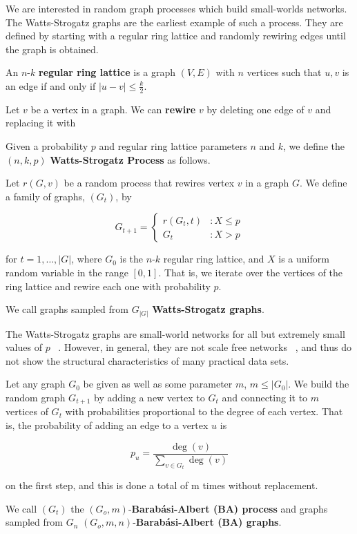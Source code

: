 We are interested in random graph processes which build small-worlds networks.
The Watts-Strogatz graphs are the earliest example of such a process. They are
defined by starting with a regular ring lattice and randomly rewiring edges
until the graph is obtained.

\begin{definition}
  An $n$-$k$ \textbf{regular ring lattice} is a graph $(V, E)$ with $n$ vertices
  such that $u,v$ is an edge if and only if $|u-v| \leq \frac{k}{2}$.
\end{definition}

\begin{definition}
  Let $v$ be a vertex in a graph. We can \textbf{rewire} $v$ by deleting one
  edge of $v$ and replacing it with 
\end{definition}

\begin{definition}
  Given a probability $p$ and regular ring lattice parameters $n$ and $k$, we
  define the $(n,k,p)$ \textbf{Watts-Strogatz Process} as follows.

  Let $r(G,v)$ be a random process that rewires vertex $v$ in a graph $G$. We
  define a family of graphs, $(G_t)$, by

  \[
    G_{t+1} = \left\{
      \begin{array}{lc}
        r(G_t,t) &: X \leq p \\
        G_t &: X > p
      \end{array}
    \right.
  \]

  for $t = 1,\dots, |G|$, where $G_0$ is the $n$-$k$ regular ring lattice, and
  $X$ is a uniform random variable in the range $[0,1]$. That is, we iterate
  over the vertices of the ring lattice and rewire each one with probability
  $p$.

  We call graphs sampled from $G_{|G|}$ \textbf{Watts-Strogatz graphs}.
\end{definition}

The Watts-Strogatz graphs are small-world networks for all but extremely small
values of $p$ ~\cite{Watts1998Collective}. However, in general, they are not
scale free networks ~\cite{Barabasi509}, and thus do not show the structural
characteristics of many practical data sets.

\begin{definition}
  Let any graph $G_0$ be given as well as some parameter $m$, $m \leq |G_0|$. We
  build the random graph $G_{t+1}$ by adding a new vertex to $G_t$ and
  connecting it to $m$ vertices of $G_t$ with probabilities proportional to the
  degree of each vertex. That is, the probability of adding an edge to a vertex
  $u$ is

  \[
    p_u = \frac{\deg(v)}{\sum_{v \in G_t} \deg(v)}
  \]

  on the first step, and this is done a total of m times without replacement.

  We call $(G_t)$ the $(G_o,m)$-\textbf{Barab\'asi-Albert (BA) process} and graphs
  sampled from $G_n$ $(G_o,m,n)$-\textbf{Barab\'asi-Albert (BA) graphs}.
\end{definition}

